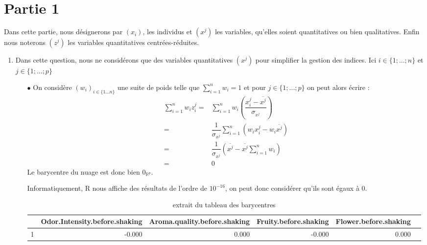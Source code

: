 \documentclass{article}
\begin{document}
\section{Partie 1}
Dans cette partie, nous désignerons par $(x_{i})$, les individus et $(x^{j})$ les variables, qu'elles soient quantitatives ou bien qualitatives. Enfin nous noterons $(z^{j})$ les variables quantitatives centrées-réduites. 
\begin{enumerate}
    \item Dans cette question, nous ne considérons que des variables quantitatives $(x^j)$ pour simplifier la gestion des indices. Ici $i\in\{1;...;n\}$ et $j\in\{1;...;p\}$ 
    \begin{itemize}
        \item[$\bullet$] On considère $(w_{i})_{i\in\{1...n\}}$ une suite de poids telle que $\displaystyle\sum_{i=1}^{n} w_i=1$ et pour $j\in\{1;...;p\}$ on peut alors écrire : 
        \begin{align*}
            \sum_{i=1}^{n} w_i z_i^j = & \sum_{i=1}^{n} w_i \left(\dfrac{x_i^j-\overline{x^j}}{\sigma_{x^j}}\right)\\
            =& \dfrac{1}{\sigma_{x^j}}\sum_{i=1}^{n}\left(w_i x_{i}^j-w_i \overline{x^j}\right) \\
            =&\dfrac{1}{\sigma_{x^j}} \left(\overline{x^j}-\overline{x^j}\sum_{i=1}^{n} w_i\right)\\
            =& 0
        \end{align*}
    Le barycentre du nuage est donc bien $0_{\mathbb{R}^{p}}$.
    
    Informatiquement, R nous affiche des résultats de l'ordre de $10^{-16}$, on peut donc considérer qu'ils sont égaux à $0$.
    
  \begin{center}
    \begin{table}[ht]
\centering
\begin{tabular}{rrrrrr}
  \hline
 & Odor.Intensity.before.shaking & Aroma.quality.before.shaking & Fruity.before.shaking & Flower.before.shaking \\ 
  \hline
1 & -0.000 & 0.000 & -0.000 & 0.000 \\ 
   \hline
\end{tabular}
\caption{extrait du tableau des barycentres} 
\end{table}
  \end{center}
    



\end{itemize}
\end{enumerate}
\end{document}
